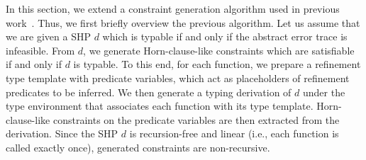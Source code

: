 
In this section, we extend a constraint generation algorithm used in 
previous work~\cite{Unno2009,Terauchi2010,KobayashiPLDI2011}.  Thus, we 
first briefly overview the previous algorithm.  Let us assume that we 
are given a SHP \(d\) which is typable if and only if the abstract error 
trace is infeasible.  From \(d\), we generate Horn-clause-like 
constraints which are satisfiable if and only if \(d\) is typable.  To 
this end, for each function, we prepare a refinement type template with 
predicate variables, which act as placeholders of refinement predicates 
to be inferred.  We then generate a typing derivation of \(d\) under the 
type environment that associates each function with its type template.  
Horn-clause-like constraints on the predicate variables are then 
extracted from the derivation.  Since the SHP $d$ is recursion-free and 
linear (i.e., each function is called exactly once), generated 
constraints are non-recursive.  

